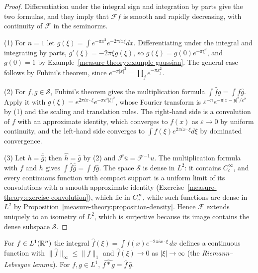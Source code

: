 \begin{proof}
Differentiation under the integral sign and integration by parts give the two formulas, and they imply that $\mathcal{F}f$ is smooth and rapidly decreasing, with continuity of $\mathcal{F}$ in the seminorms.

(1) For $n = 1$ let $g(\xi) = \int e^{-\pi x^2}e^{-2\pi ix\xi}dx$. Differentiating under the integral and integrating by parts, $g'(\xi) = -2\pi\xi g(\xi)$, so $g(\xi) = g(0)e^{-\pi\xi^2}$, and $g(0) = 1$ by
Example~\ref{measure-theory:example-gaussian}. The general case follows by Fubini's theorem, since $e^{-\pi|x|^2} = \prod_je^{-\pi x_j^2}$.

(2) For $f, g \in \mathcal{S}$, Fubini's theorem gives the multiplication formula $\int\hat fg = \int f\hat g$. Apply it with $g(\xi) = e^{2\pi ix\cdot\xi}e^{-\pi\varepsilon^2|\xi|^2}$, whose Fourier transform is
$\varepsilon^{-n}e^{-\pi|x - y|^2/\varepsilon^2}$ by (1) and the scaling and translation rules. The right-hand side is a convolution of $f$ with an approximate identity, which converges to $f(x)$ as
$\varepsilon \to 0$ by uniform continuity, and the left-hand side converges to $\int\hat f(\xi)e^{2\pi ix\cdot\xi}d\xi$ by dominated convergence.

(3) Let $h = \overline{\hat g}$; then $\hat h = \bar g$ by (2) and $\overline{\mathcal{F}\bar u} = \mathcal{F}^{-1}u$. The multiplication formula with $f$ and $h$ gives $\int\hat f\overline{\hat g} = \int f\bar g$.
The space $\mathcal{S}$ is dense in $L^2$: it contains $C_c^\infty$, and every continuous function with compact support is a uniform limit of its convolutions with a smooth approximate identity
(Exercise~\ref{measure-theory:exercise-convolution}), which lie in $C_c^\infty$, while such functions are dense in $L^2$ by Proposition~\ref{measure-theory:proposition-density}. Hence $\mathcal{F}$ extends
uniquely to an isometry of $L^2$,
which is surjective because its image contains the dense subspace $\mathcal{S}$.
\end{proof}

\begin{proposition}\label{distributions:proposition-fourier-l1}
For $f \in L^1(\mathbb{R}^n)$ the integral $\hat f(\xi) = \int f(x)e^{-2\pi ix\cdot\xi}\,dx$ defines a continuous function with $\|\hat f\|_\infty \leq \|f\|_1$ and $\hat f(\xi) \to 0$ as $|\xi| \to \infty$ (the
\emph{Riemann--Lebesgue lemma}). For $f, g \in L^1$, $\widehat{f * g} = \hat f\,\hat g$.
\end{proposition}

